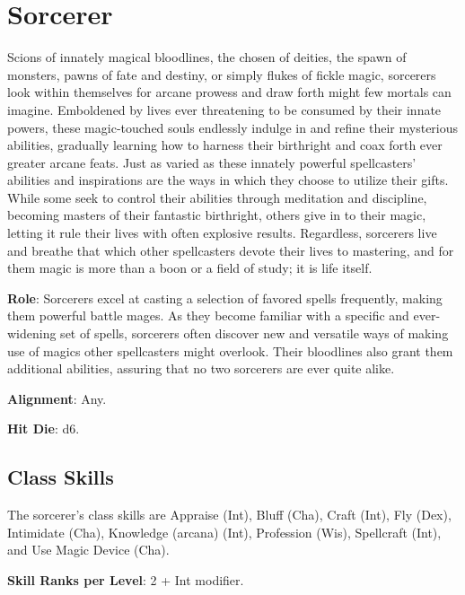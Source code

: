 \section{Sorcerer}

\label{f0}				
Scions of innately magical bloodlines, the chosen of deities, the spawn of monsters, pawns of fate and destiny, or simply flukes of fickle magic, sorcerers look within themselves for arcane prowess and draw forth might few mortals can imagine. Emboldened by lives ever threatening to be consumed by their innate powers, these magic-touched souls endlessly indulge in and refine their mysterious abilities, gradually learning how to harness their birthright and coax forth ever greater arcane feats. Just as varied as these innately powerful spellcasters' abilities and inspirations are the ways in which they choose to utilize their gifts. While some seek to control their abilities through meditation and discipline, becoming masters of their fantastic birthright, others give in to their magic, letting it rule their lives with often explosive results. Regardless, sorcerers live and breathe that which other spellcasters devote their lives to mastering, and for them magic is more than a boon or a field of study; it is life itself.
				
\textbf{Role}: Sorcerers excel at casting a selection of favored spells frequently, making them powerful battle mages. As they become familiar with a specific and ever-widening set of spells, sorcerers often discover new and versatile ways of making use of magics other spellcasters might overlook. Their bloodlines also grant them additional abilities, assuring that no two sorcerers are ever quite alike.
				
\textbf{Alignment}: Any.
				
\textbf{Hit Die}: d6.
				
\subsection{Class Skills}

				
The sorcerer's class skills are Appraise (Int), Bluff (Cha), Craft (Int), Fly (Dex), Intimidate (Cha), Knowledge (arcana) (Int), Profession (Wis), Spellcraft (Int), and Use Magic Device (Cha).
				
\textbf{Skill Ranks per Level}: 2 + Int modifier.

